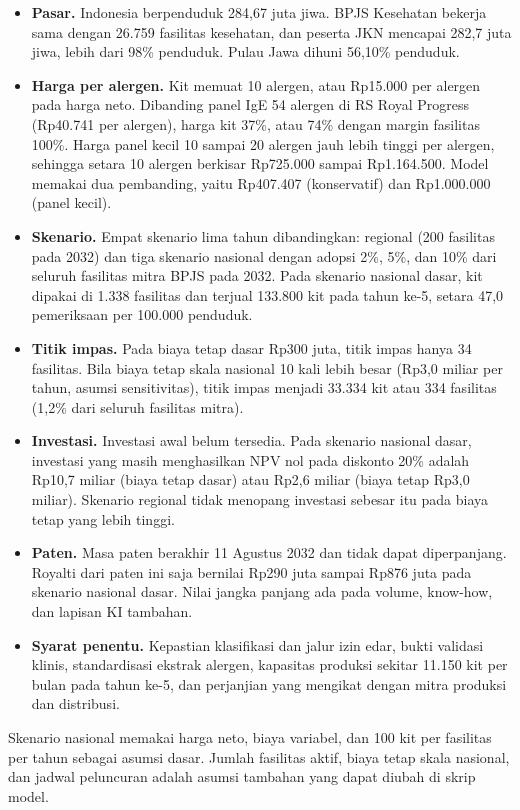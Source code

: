 \documentclass[11pt,a4paper]{article}
\begin{document}
\begin{itemize}
\item \textbf{Pasar.} Indonesia berpenduduk 284,67 juta jiwa. BPJS Kesehatan bekerja sama dengan 26.759 fasilitas kesehatan, dan peserta JKN mencapai 282,7 juta jiwa, lebih dari 98\% penduduk. Pulau Jawa dihuni 56,10\% penduduk.
\item \textbf{Harga per alergen.} Kit memuat 10 alergen, atau Rp15.000 per alergen pada harga neto. Dibanding panel IgE 54 alergen di RS Royal Progress (Rp40.741 per alergen), harga kit 37\%, atau 74\% dengan margin fasilitas 100\%. Harga panel kecil 10 sampai 20 alergen jauh lebih tinggi per alergen, sehingga setara 10 alergen berkisar Rp725.000 sampai Rp1.164.500. Model memakai dua pembanding, yaitu Rp407.407 (konservatif) dan Rp1.000.000 (panel kecil).
\item \textbf{Skenario.} Empat skenario lima tahun dibandingkan: regional (200 fasilitas pada 2032) dan tiga skenario nasional dengan adopsi 2\%, 5\%, dan 10\% dari seluruh fasilitas mitra BPJS pada 2032. Pada skenario nasional dasar, kit dipakai di 1.338 fasilitas dan terjual 133.800 kit pada tahun ke-5, setara 47,0 pemeriksaan per 100.000 penduduk.
\item \textbf{Titik impas.} Pada biaya tetap dasar Rp300 juta, titik impas hanya 34 fasilitas. Bila biaya tetap skala nasional 10 kali lebih besar (Rp3,0 miliar per tahun, asumsi sensitivitas), titik impas menjadi 33.334 kit atau 334 fasilitas (1,2\% dari seluruh fasilitas mitra).
\item \textbf{Investasi.} Investasi awal belum tersedia. Pada skenario nasional dasar, investasi yang masih menghasilkan NPV nol pada diskonto 20\% adalah Rp10,7 miliar (biaya tetap dasar) atau Rp2,6 miliar (biaya tetap Rp3,0 miliar). Skenario regional tidak menopang investasi sebesar itu pada biaya tetap yang lebih tinggi.
\item \textbf{Paten.} Masa paten berakhir 11 Agustus 2032 dan tidak dapat diperpanjang. Royalti dari paten ini saja bernilai Rp290 juta sampai Rp876 juta pada skenario nasional dasar. Nilai jangka panjang ada pada volume, know-how, dan lapisan KI tambahan.
\item \textbf{Syarat penentu.} Kepastian klasifikasi dan jalur izin edar, bukti validasi klinis, standardisasi ekstrak alergen, kapasitas produksi sekitar 11.150 kit per bulan pada tahun ke-5, dan perjanjian yang mengikat dengan mitra produksi dan distribusi.
\end{itemize}

\begin{catatan}
Skenario nasional memakai harga neto, biaya variabel, dan 100 kit per fasilitas per tahun sebagai asumsi dasar. Jumlah fasilitas aktif, biaya tetap skala nasional, dan jadwal peluncuran adalah asumsi tambahan yang dapat diubah di skrip model.
\end{catatan}
\end{document}
